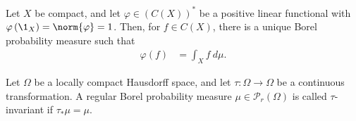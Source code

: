 \begin{theorem}
  Let $X$ be compact, and let $\varphi\in \left(C\left(X\right)\right)^{\ast}$ be a positive linear functional with $\varphi\left(\1_{X}\right) = \norm{\varphi} = 1$. Then, for $f\in C(X)$, there is a unique Borel probability measure such that
  \begin{align*}
    \varphi\left(f\right) &= \int_{X}^{} f\:d\mu.
  \end{align*}
\end{theorem}
\begin{definition}
  Let $\Omega$ be a locally compact Hausdorff space, and let $\tau: \Omega\rightarrow \Omega$ be a continuous transformation. A regular Borel probability measure $\mu\in \mathcal{P}_{r}\left(\Omega\right)$ is called $\tau$-invariant if $\tau_{\ast}\mu = \mu$.
\end{definition}

